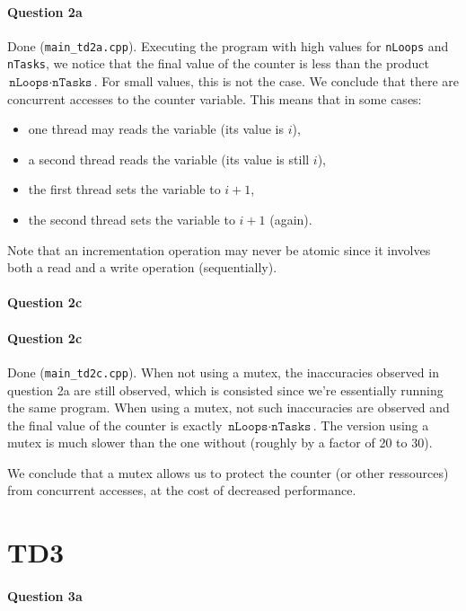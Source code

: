 \documentclass[a4paper,oneside,11pt]{article}
\begin{document}
\paragraph{Question 2a} Done (\texttt{main\_td2a.cpp}). Executing the program with high values for \texttt{nLoops} and \texttt{nTasks}, we notice that the final value of the counter is less than the product $\texttt{nLoops}\cdot\texttt{nTasks}$. For small values, this is not the case. We conclude that there are concurrent accesses to the counter variable. This means that in some cases:
\begin{itemize}
  \item  one thread may reads the variable (its value is $i$),
  \item a second thread reads the variable (its value is still $i$),
  \item the first thread sets the variable to $i+1$,
  \item the second thread sets the variable to $i+1$ (again).
\end{itemize}

Note that an incrementation operation may never be atomic since it involves both a read and a write operation (sequentially).

\paragraph{Question 2c}

\paragraph{Question 2c} Done (\texttt{main\_td2c.cpp}). When not using a mutex, the inaccuracies observed in question 2a are still observed, which is consisted since we're essentially running the same program. When using a mutex, not such inaccuracies are observed and the final value of the counter is exactly $\texttt{nLoops}\cdot\texttt{nTasks}$. The version using a mutex is much slower than the one without (roughly by a factor of 20 to 30).

We conclude that a mutex allows us to protect the counter (or other ressources) from concurrent accesses, at the cost of decreased performance.

\section*{TD3}
\paragraph{Question 3a}
\end{document}

